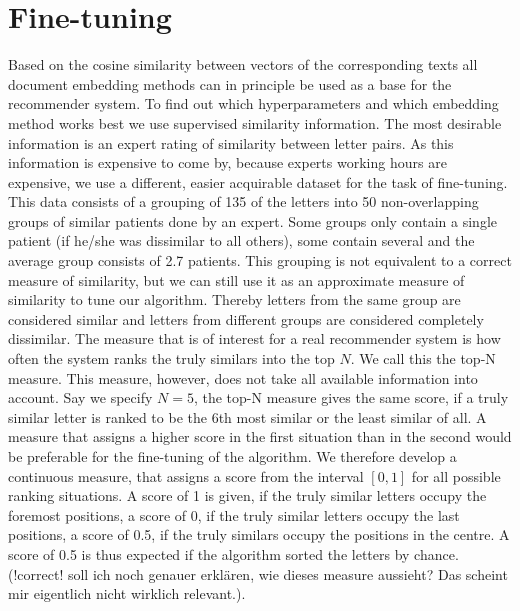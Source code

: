 \section{Fine-tuning}
Based on the cosine similarity between vectors of the corresponding texts all document embedding methods can in principle be used as a base for the recommender system. To find out which hyperparameters and which embedding method works best we use supervised similarity information. The most desirable information is an expert rating of similarity between letter pairs. As this information is expensive to come by, because experts working hours are expensive, we use a different, easier acquirable dataset for the task of fine-tuning. This data consists of a grouping of 135 of the letters into 50 non-overlapping groups of similar patients done by an expert. Some groups only contain a single patient (if he/she was dissimilar to all others), some contain several and the average group consists of 2.7 patients. This grouping is not equivalent to a correct measure of similarity, but we can still use it as an approximate measure of similarity to tune our algorithm. Thereby letters from the same group are considered similar and letters from different groups are considered completely dissimilar. The measure that is of interest for a real recommender system is how often the system ranks the truly similars into the top $N$. We call this the top-N measure. This measure, however, does not take all available information into account. Say we specify $N=5$, the top-N measure gives the same score, if a truly similar letter is ranked to be the 6th most similar or the least similar of all. A measure that assigns a higher score in the first situation than in the second would be preferable for the fine-tuning of the algorithm. We therefore develop a continuous measure, that assigns a score from the interval $[0,1]$ for all possible ranking situations. A score of 1 is given, if the truly similar letters occupy the foremost positions, a score of 0, if the truly similar letters occupy the last positions, a score of 0.5, if the truly similars occupy the positions in the centre. A score of 0.5 is thus expected if the algorithm sorted the letters by chance. (!correct! soll ich noch genauer erklären, wie dieses measure aussieht? Das scheint mir eigentlich nicht wirklich relevant.).

